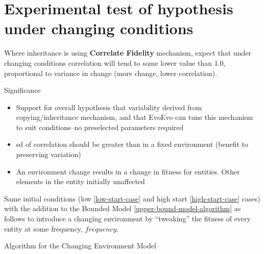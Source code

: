 %
%

\chapter[Test under changing conditions]{Experimental test of hypothesis under changing conditions}\label{experimental-test-of-h2-under-changing-conditions}

Where inheritance is using \textbf{Correlate Fidelity} mechanism, expect
that under changing conditions correlation will tend to some lower value
than 1.0, proportional to variance in change (more change, lower
correlation).

Significance

\begin{itemize}
	\item
 Support for overall hypothesis that variability derived from
 copying/inheritance mechanism, and that EvoEvo can tune this mechanism
 to suit conditions--no preselected parameters required
	\item
 \gls{sd} of correlation should be greater than in a fixed environment
 (benefit to preserving variation)
	\item
 An environment change results in a change in fitness for entities.
 Other elements in the entity initially unaffected
\end{itemize}

Same initial conditions (low \cref{low-start-case} and high start \cref{high-start-case} cases) with the addition to the Bounded Model \autoref{upper-bound-model-algorithm} as follows to introduce a changing environment by ``tweaking'' the fitness of every entity at some frequency, $frequency$.

\begin{algorithm}
	\caption{Algorithm for the Changing Environment Model}\label{changingmodelalgorithm}
\end{algorithm}

